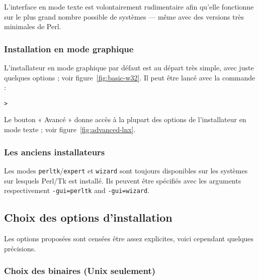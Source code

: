 \documentclass[german, english, french]{article}
\begin{document}
L'interface en mode texte est volontairement rudimentaire afin qu'elle fonctionne
sur le plus grand nombre possible de systèmes --- même avec des versions très
minimales de Perl.

\subsubsection{Installation en mode graphique}
\label{sec:graphical-inst}

L'installateur en mode graphique par défaut est au départ très simple, avec
juste quelques options ; voir figure~\ref{fig:basic-w32}. Il peut être lancé
avec la commande :
\begin{alltt}
> 
\end{alltt}

Le bouton « Avancé » donne accès à la plupart des options de l'installateur en
mode texte ; voir figure~\ref{fig:advanced-lnx}.

\subsubsection{Les anciens installateurs}

Les modes \texttt{perltk}/\texttt{expert} et \texttt{wizard} sont toujours
disponibles sur les systèmes sur lesquels Perl/Tk est installé. Ils peuvent être
spécifiés avec les arguments respectivement \texttt{-gui=perltk} and
\texttt{-gui=wizard}.

\subsection{Choix des options d'installation}
\label{sec:runinstall}

Les options proposées sont censées être assez explicites, voici cependant
quelques précisions.

\subsubsection{Choix des binaires (Unix seulement)}
\label{sec:binary}
\end{document}
